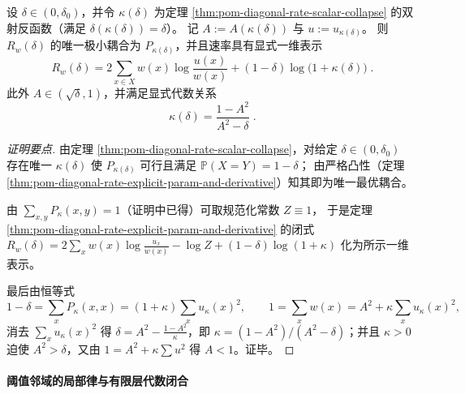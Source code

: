 \begin{corollary}[一维闭式速率与代数回收：\texorpdfstring{$\kappa=\frac{1-A^2}{A^2-\delta}$}{kappa=(1-A^2)/(A^2-delta)}]\label{cor:pom-diagonal-rate-scalar-collapse-rate}
设 \(\delta\in(0,\delta_0)\)，并令 \(\kappa(\delta)\) 为定理 \ref{thm:pom-diagonal-rate-scalar-collapse} 的双射反函数（满足 \(\delta(\kappa(\delta))=\delta\)）。
记 \(A:=A(\kappa(\delta))\) 与 \(u:=u_{\kappa(\delta)}\)。
则 \(R_w(\delta)\) 的唯一极小耦合为 \(P_{\kappa(\delta)}\)，并且速率具有显式一维表示
\[
\boxed{\;
R_w(\delta)=2\sum_{x\in X}w(x)\log\frac{u(x)}{w(x)}+(1-\delta)\log\bigl(1+\kappa(\delta)\bigr)\; }.
\]
此外 \(A\in(\sqrt\delta,1)\)，并满足显式代数关系
\[
\boxed{\;
\kappa(\delta)=\frac{1-A^2}{A^2-\delta}\; } .
\]
\end{corollary}
\begin{proof}[证明要点]
由定理 \ref{thm:pom-diagonal-rate-scalar-collapse}，对给定 \(\delta\in(0,\delta_0)\) 存在唯一 \(\kappa(\delta)\) 使 \(P_{\kappa(\delta)}\) 可行且满足 \(\mathbb P(X=Y)=1-\delta\)；
由严格凸性（定理 \ref{thm:pom-diagonal-rate-explicit-param-and-derivative}）知其即为唯一最优耦合。
\par
由 \(\sum_{x,y}P_{\kappa}(x,y)=1\)（证明中已得）可取规范化常数 \(Z\equiv 1\)，
于是定理 \ref{thm:pom-diagonal-rate-explicit-param-and-derivative} 的闭式
\(
R_w(\delta)=2\sum_x w(x)\log\frac{u_x}{w(x)}-\log Z+(1-\delta)\log(1+\kappa)
\)
化为所示一维表示。
\par
最后由恒等式
\[
1-\delta=\sum_x P_\kappa(x,x)=(1+\kappa)\sum_x u_\kappa(x)^2,
\qquad
1=\sum_x w(x)=A^2+\kappa\sum_x u_\kappa(x)^2,
\]
消去 \(\sum_x u_\kappa(x)^2\) 得
\(
\delta=A^2-\frac{1-A^2}{\kappa}
\)，即 \(\kappa=(1-A^2)/(A^2-\delta)\)；并且 \(\kappa>0\) 迫使 \(A^2>\delta\)，又由 \(1=A^2+\kappa\sum u^2\) 得 \(A<1\)。证毕。
\end{proof}

\paragraph{阈值邻域的局部律与有限层代数闭合}

